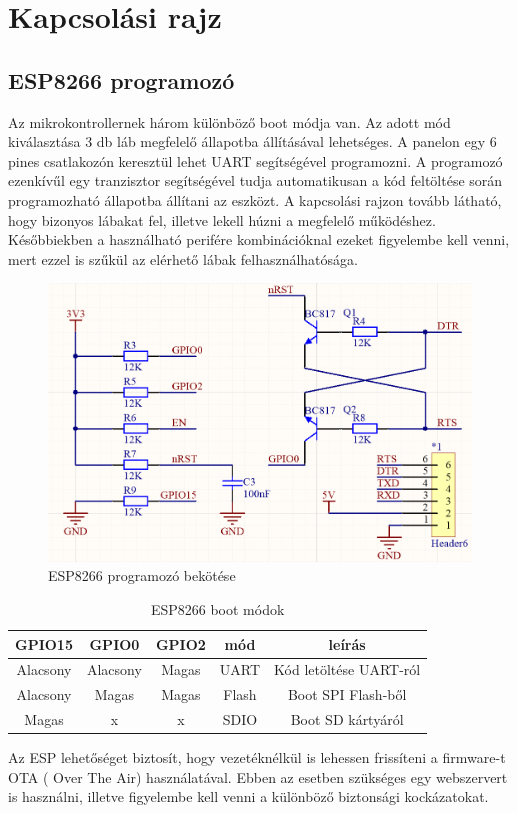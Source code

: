 \section{Kapcsolási rajz}

\subsection{ESP8266 programozó}
Az mikrokontrollernek három különböző boot módja van. Az adott mód kiválasztása 3 db láb megfelelő állapotba állításával lehetséges. A panelon egy 6 pines csatlakozón keresztül lehet UART segítségével programozni. A programozó ezenkívűl egy tranzisztor segítségével tudja automatikusan a kód feltöltése során programozható állapotba állítani az eszközt. A kapcsolási rajzon tovább látható, hogy bizonyos lábakat fel, illetve lekell húzni a megfelelő működéshez. Későbbiekben a használható perifére kombinációknal ezeket figyelembe kell venni, mert ezzel is szűkül az elérhető lábak felhasználhatósága.

\begin{figure}[!ht]
    \centering
    \includegraphics[width=130mm, keepaspectratio]{figures/programmer.png}
    \caption{ESP8266 programozó bekötése}
    \label{fig:TeXstudio}
\end{figure}

\begin{table}[ht]
	\footnotesize
	\centering
	\begin{tabular}{ | c | c | c | c | c |}
		\toprule
		GPIO15 & GPIO0 & GPIO2 & mód & leírás \\
		\midrule
        Alacsony & Alacsony & Magas & UART & Kód letöltése UART-ról \\
        \hline
        Alacsony & Magas & Magas & Flash & Boot SPI Flash-ből \\
        \hline
		Magas & x  & x & SDIO & Boot SD kártyáról \\
		\bottomrule
	\end{tabular}
	\caption{ESP8266 boot módok}
	\label{tab:TabularExample}
\end{table}
Az ESP lehetőséget biztosít, hogy vezetéknélkül is lehessen frissíteni a firmware-t OTA ( Over The Air) használatával. Ebben az esetben szükséges egy webszervert is használni, illetve figyelembe kell venni a különböző biztonsági kockázatokat.


